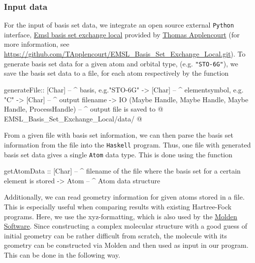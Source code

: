 \documentclass[twoside,        %
			   11pt,			%
               BCOR10mm,       %
               ngerman,english  %
               ]{scrartcl}
\begin{document}
\subsubsection{Input data}
For the input of basis set data, we integrate an open source external \texttt{Python} interface, \href{https://github.com/TApplencourt/EMSL_Basis_Set_Exchange_Local.git}{Emsl basis set exchange local} provided by \href{https://github.com/TApplencourt}{Thomas Applencourt} (for more information, see \url{https://github.com/TApplencourt/EMSL_Basis_Set_Exchange_Local.git}). To generate basis set data for a given atom and orbital type, (e.g. \texttt{"STO-6G"}), we save the basis set data to a file, for each atom respectively by the function
\begin{code}
generateFile:: [Char] -- ^ basis, e.g."STO-6G"
		-> [Char] -- ^ elementsymbol, e.g. "C"
		-> [Char] -- ^ output filename
		-> IO (Maybe Handle, Maybe Handle, Maybe Handle, ProcessHandle) -- ^ output file is saved to @ EMSL_Basis_Set_Exchange_Local/data/ @
\end{code}
From a given file with basis set information, we can then parse the basis set information from the file into the \texttt{Haskell} program. Thus, one file with generated basis set data gives a single \texttt{Atom} data type. This is done using the function
\begin{code}
getAtomData :: [Char] -- ^ filename of the file where the basis set for a certain element is stored
		-> Atom -- ^ Atom data structure
\end{code}
Additionally, we can read geometry information for given atoms stored in a file. This is especially useful when comparing results with existing Hartree-Fock programs. Here, we use the xyz-formatting, which is also used by the \href{http://www.cmbi.ru.nl/molden/}{Molden Software}. Since constructing a complex molecular structure with a good guess of initial geometry can be rather difficult from scratch, the molecule with its geometry can be constructed via Molden and then used as input in our program. This can be done in the following way.
\end{document}
